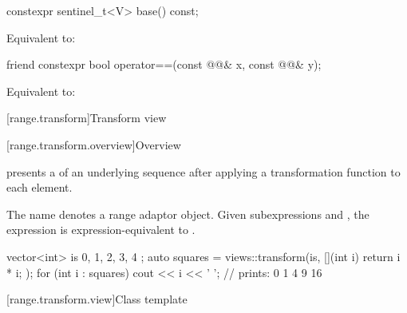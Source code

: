 %
\begin{itemdecl}
constexpr sentinel_t<V> base() const;
\end{itemdecl}

\begin{itemdescr}
\pnum
\effects
Equivalent to: 
\end{itemdescr}

%
\begin{itemdecl}
friend constexpr bool operator==(const @@& x, const @@& y);
\end{itemdecl}

\begin{itemdescr}
\pnum
\effects
Equivalent to: 
\end{itemdescr}

[range.transform]{Transform view}

[range.transform.overview]{Overview}

\pnum
{} presents
a  of an underlying sequence after
applying a transformation function to each element.

\pnum
{}%
The name  denotes a
range adaptor object.
Given subexpressions  and , the expression
 is expression-equivalent to
.

\pnum
\begin{example}
\begin{codeblock}
vector<int> is{ 0, 1, 2, 3, 4 };
auto squares = views::transform(is, [](int i) { return i * i; });
for (int i : squares)
  cout << i << ' '; // prints: 0 1 4 9 16
\end{codeblock}
\end{example}

[range.transform.view]{Class template }


